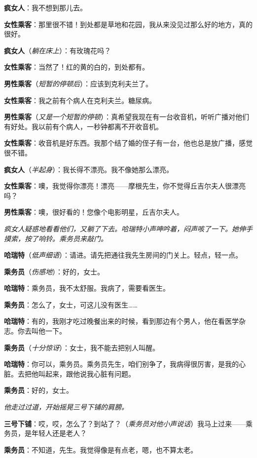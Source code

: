 \documentclass[lang=cn,newtx,12pt,scheme=chinese]{elegantbook}
\begin{document}
\textbf{疯女人}：我不想到那儿去。

\textbf{女性乘客}：那里很不错！到处都是草地和花园，我从来没见过那么好的地方，真的很好。

\textbf{疯女人}（\textit{躺在床上}）：有玫瑰花吗？

\textbf{女性乘客}：当然了！红的黄的白的，到处都有。

\textbf{男性乘客}（\textit{短暂的停顿后}）：应该到克利夫兰了。

\textbf{女性乘客}：我之前有个病人在克利夫兰。糖尿病。

\textbf{男性乘客}（\textit{又是一个短暂的停顿}）：真希望我现在有一台收音机，听听广播对他们有好处。我以前有个病人，一秒钟都离不开收音机。

\textbf{女性乘客}：收音机是好东西。我那个结了婚的侄子有一台，他也总是放广播，感觉很不错。

\textbf{疯女人}（\textit{半起身}）：我长得不漂亮。我不像她那么漂亮。

\textbf{女性乘客}：噢，我觉得你漂亮！漂亮——摩根先生，你不觉得丘吉尔夫人很漂亮吗？

\textbf{男性乘客}：噢，很好看的！您像个电影明星，丘吉尔夫人。

\textit{疯女人疑惑地看看他们，又躺了下去。哈瑞特小声呻吟着，闷声咳了一下。她伸手摸索，按了响铃。乘务员来敲门。}

\textbf{哈瑞特}（\textit{低声细语}）：请进。请先把通往我先生房间的门关上。轻点，轻一点。

\textbf{乘务员}（\textit{伤感地}）：好的，女士。

\textbf{哈瑞特}：乘务员，我不太舒服。我病了，需要看医生。

\textbf{乘务员}：怎么了，女士，可这儿没有医生……

\textbf{哈瑞特}：有的，我刚才吃过晚餐出来的时候，看到那边有个男人，他在看医学杂志。你去叫他一下。

\textbf{乘务员}（\textit{十分惊讶}）：女士，我不能去把别人叫醒。

\textbf{哈瑞特}：你可以，乘务员。乘务员先生，咱们别争了，我病得很厉害，是我的心脏。去把他叫起来，跟他说我心脏有问题。

\textbf{乘务员}：好的，女士。

\textit{他走过过道，开始摇晃三号下铺的肩膀。}

\textbf{三号下铺}：哎，哎，怎么了？到站了？（\textit{乘务员对他小声说话}）我马上过来——乘务员，是年轻人还是老人？

\textbf{乘务员}：不知道，先生。我觉得像是有点老，嗯，也不算太老。
\end{document}
